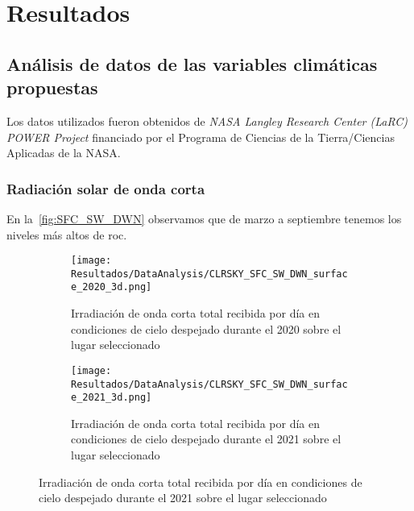 \chapter{Resultados}
	
	\section{Análisis de datos de las variables climáticas propuestas}
	
	Los datos utilizados fueron obtenidos de \textit{NASA Langley Research Center (LaRC) POWER Project} financiado por el Programa de Ciencias de la Tierra/Ciencias Aplicadas de la NASA.
	
		\subsection{Radiación solar de onda corta}
			
			En la~\cref{fig:SFC_SW_DWN} observamos que de marzo a septiembre tenemos los niveles más altos de \acrlong{roc}.
	
			\begin{figure}[H]
				\centering
				\begin{subfigure}[t]{0.45\linewidth}
					\centering
					\texttt{[image: Resultados/DataAnalysis/CLRSKY\_SFC\_SW\_DWN\_surface\_2020\_3d.png]}
					\caption{Irradiación de onda corta total recibida por día en condiciones de cielo despejado durante el 2020 sobre el lugar seleccionado}
					\label{fig:CLRSKY_SFC_SW_DWN_surface_2020_3d}
				\end{subfigure}
				\hfill
				\begin{subfigure}[t]{0.45\linewidth}
					\centering
					\texttt{[image: Resultados/DataAnalysis/CLRSKY\_SFC\_SW\_DWN\_surface\_2021\_3d.png]}
					\caption{Irradiación de onda corta total recibida por día en condiciones de cielo despejado durante el 2021 sobre el lugar seleccionado}
					\label{fig:CLRSKY_SFC_SW_DWN_surface_2021_3d}
				\end{subfigure}
			\end{figure}
			
